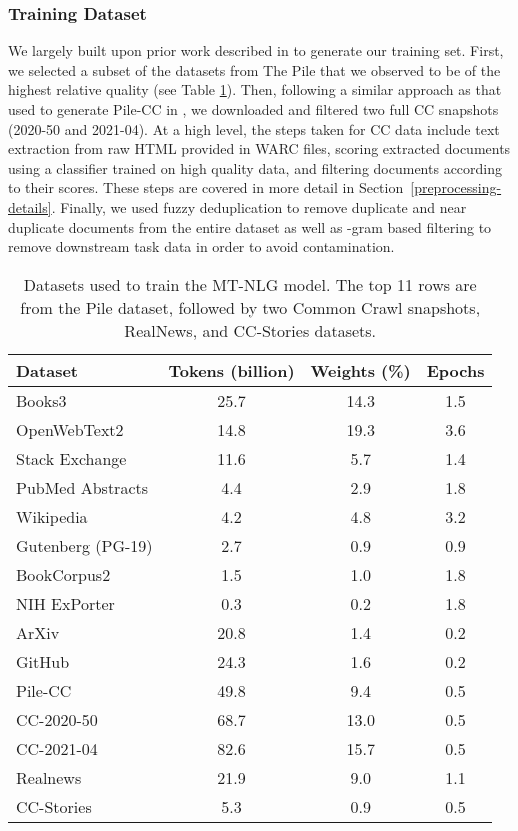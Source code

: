 \documentclass[11pt]{article}
\begin{document}
\subsubsection{Training Dataset}
We largely built upon prior work described in \citep{brown2020language,pile-dataset-2020} to generate our training set. First, we selected a subset of the datasets from The Pile that we observed to be of the highest relative quality (see Table \ref{tab:datasets-530b}). Then, following a similar approach as that used to generate Pile-CC in \citep{pile-dataset-2020}, we downloaded and filtered two full CC snapshots (2020-50 and 2021-04). At a high level, the steps taken for CC data include text extraction from raw HTML provided in WARC files, scoring extracted documents using a classifier trained on high quality data, and filtering documents according to their scores. These steps are covered in more detail in Section~\ref{preprocessing-details}. Finally, we used fuzzy deduplication to remove duplicate and near duplicate documents from the entire dataset as well as -gram based filtering to remove downstream task data in order to avoid contamination.

\begin{table}[t]
\centering
\small
\begin{tabular}{l c c c}
 \toprule
 \textbf{Dataset} &  \textbf{Tokens (billion)}  &  \textbf{Weights (\%)} &  \textbf{Epochs} \\
 \midrule
 Books3	&	25.7	&	14.3	&	1.5	\\
 OpenWebText2	&	14.8	&	19.3	&	3.6	\\
 Stack Exchange	&	11.6	&	5.7	&	1.4	\\
 PubMed Abstracts	&	4.4	&	2.9	&	1.8	\\
 Wikipedia	&	4.2	&	4.8	&	3.2	\\
 Gutenberg (PG-19)	&	2.7	&	0.9	&	0.9	\\
 BookCorpus2	&	1.5	&	1.0	&	1.8	\\
 NIH ExPorter	&	0.3	&	0.2	&	1.8	\\
 ArXiv	&	20.8	&	1.4	&	0.2	\\
 GitHub	&	24.3	&	1.6	&	0.2 \\
 Pile-CC	&	49.8	&	9.4	&	0.5	\\
 \midrule
 CC-2020-50	&	68.7	&	13.0	&	0.5	\\
 CC-2021-04	&	82.6	&	15.7	&	0.5	\\
 \midrule
 Realnews	&	21.9	&	9.0	&	1.1	\\
 CC-Stories	&	5.3	&	0.9	&	0.5	\\
 \bottomrule
\end{tabular}
\caption{Datasets used to train the MT-NLG model. The top 11 rows are from the Pile dataset, followed by two Common Crawl snapshots, RealNews, and CC-Stories datasets.}
\label{tab:datasets-530b}
\end{table}
\end{document}
